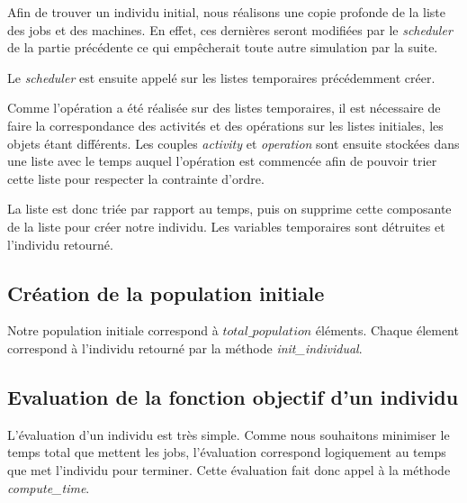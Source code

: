 Afin de trouver un individu initial, nous réalisons une copie profonde de la liste des jobs et des machines. En effet, ces dernières seront modifiées par le \textit{scheduler} de la partie précédente ce qui empêcherait toute autre simulation par la suite.



Le \textit{scheduler} est ensuite appelé sur les listes temporaires précédemment créer.



Comme l'opération a été réalisée sur des listes temporaires, il est nécessaire de faire la correspondance des activités et des opérations sur les listes initiales, les objets étant différents. Les couples \textit{activity} et \textit{operation} sont ensuite stockées dans une liste avec le temps auquel l'opération est commencée afin de pouvoir trier cette liste pour respecter la contrainte d'ordre.



La liste est donc triée par rapport au temps, puis on supprime cette composante de la liste pour créer notre individu. Les variables temporaires sont détruites et l'individu retourné.

\subsection{Création de la population initiale}



Notre population initiale correspond à $total\_population$ éléments. Chaque élement correspond à l'individu retourné par la méthode \textit{init\_individual}.

\subsection{Evaluation de la fonction objectif d'un individu}



L'évaluation d'un individu est très simple. Comme nous souhaitons minimiser le temps total que mettent les jobs, l'évaluation correspond logiquement au temps que met l'individu pour terminer. Cette évaluation fait donc appel à la méthode \textit{compute\_time}. 
\newpage

